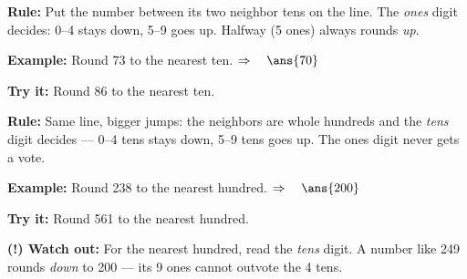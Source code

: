 \documentclass[12pt]{article}
\begin{document}


\begin{formulabox}
\textbf{Rule:} Put the number between its two neighbor tens on the line.
The \emph{ones} digit decides: 0--4 stays down, 5--9 goes up.
Halfway (5 ones) always rounds \emph{up}.
\end{formulabox}

\begin{examplebox}
\textbf{Example:} \quad Round 73 to the nearest ten.
$\Rightarrow\quad \ans{70}$
\end{examplebox}

\begin{tryitbox}
\textbf{Try it:} \quad Round 86 to the nearest ten.\\[2pt]
\end{tryitbox}


\begin{formulabox}
\textbf{Rule:} Same line, bigger jumps: the neighbors are whole hundreds and
the \emph{tens} digit decides --- 0--4 tens stays down, 5--9 tens goes up.
The ones digit never gets a vote.
\end{formulabox}

\begin{examplebox}
\textbf{Example:} \quad Round 238 to the nearest hundred.
$\Rightarrow\quad \ans{200}$
\end{examplebox}

\begin{tryitbox}
\textbf{Try it:} \quad Round 561 to the nearest hundred.\\[2pt]
\end{tryitbox}

\begin{watchoutbox}
\textbf{(!) Watch out:} For the nearest hundred, read the \emph{tens} digit.
A number like 249 rounds \emph{down} to 200 --- its 9 ones cannot outvote the
4 tens.
\end{watchoutbox}
\end{document}
